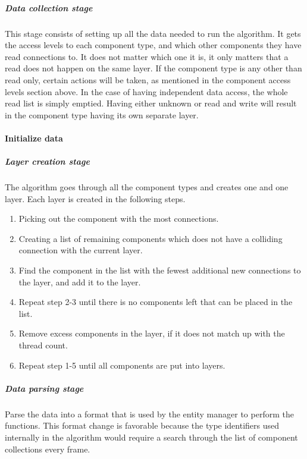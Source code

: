 \subparagraph{Data collection stage}
This stage consists of setting up all the data needed to run the algorithm.
It gets the access levels to each component type, and which other components they have read connections to.
It does not matter which one it is, it only matters that a read does not happen on the same layer.
If the component type is any other than read only, certain actions will be taken, as mentioned in the component access levels section above.
In the case of having independent data access, the whole read list is simply emptied.
Having either unknown or read and write will result in the component type having its own separate layer.

\paragraph{Initialize data}


\subparagraph{Layer creation stage}
The algorithm goes through all the component types and creates one and one layer.
Each layer is created in the following steps.

\begin{enumerate}
    \item Picking out the component with the most connections.

    \item Creating a list of remaining components which does not have a colliding connection with the current layer.
    
    \item Find the component in the list with the fewest additional new connections to the layer, and add it to the layer.
    
    \item Repeat step 2-3 until there is no components left that can be placed in the list.
    
    \item Remove excess components in the layer, if it does not match up with the thread count.
    
    \item Repeat step 1-5 until all components are put into layers.
\end{enumerate}

\subparagraph{Data parsing stage}
Parse the data into a format that is used by the entity manager to perform the functions.
This format change is favorable because the type identifiers used internally in the algorithm would require a search through the list of component collections every frame.


